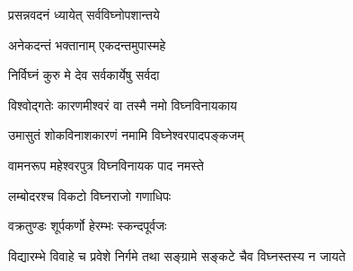 
{प्रसन्नवदनं ध्यायेत् सर्वविघ्नोपशान्तये}

{अनेकदन्तं भक्तानाम् एकदन्तमुपास्महे}

{निर्विघ्नं कुरु मे देव सर्वकार्येषु सर्वदा}

{विश्वोद्गतेः कारणमीश्वरं वा तस्मै नमो विघ्नविनायकाय}

{उमासुतं शोकविनाशकारणं नमामि विघ्नेश्वरपादपङ्कजम्}

{वामनरूप महेश्वरपुत्र विघ्नविनायक पाद नमस्ते}

{लम्बोदरश्च विकटो विघ्नराजो गणाधिपः}

{वक्रतुण्डः शूर्पकर्णो हेरम्भः स्कन्दपूर्वजः}

{विद्यारम्भे विवाहे च प्रवेशे निर्गमे तथा}
{सङ्ग्रामे सङ्कटे चैव विघ्नस्तस्य न जायते}